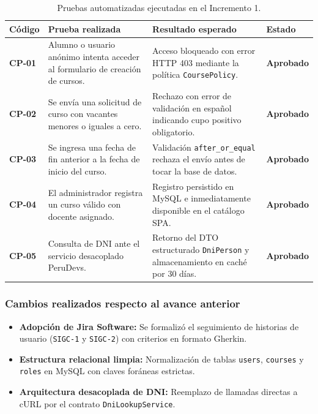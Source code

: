 \begin{table}[H]
\centering
\small
\begin{tabularx}{\textwidth}{P{1.8cm} P{4.8cm} P{4.5cm} Y}
\toprule
\textbf{Código} & \textbf{Prueba realizada} & \textbf{Resultado esperado} & \textbf{Estado} \\
\midrule
\textbf{CP-01} & Alumno o usuario anónimo intenta acceder al formulario de creación de cursos. & Acceso bloqueado con error HTTP 403 mediante la política \texttt{CoursePolicy}. & \textbf{Aprobado} \\
\addlinespace
\textbf{CP-02} & Se envía una solicitud de curso con vacantes menores o iguales a cero. & Rechazo con error de validación en español indicando cupo positivo obligatorio. & \textbf{Aprobado} \\
\addlinespace
\textbf{CP-03} & Se ingresa una fecha de fin anterior a la fecha de inicio del curso. & Validación \texttt{after\_or\_equal} rechaza el envío antes de tocar la base de datos. & \textbf{Aprobado} \\
\addlinespace
\textbf{CP-04} & El administrador registra un curso válido con docente asignado. & Registro persistido en MySQL e inmediatamente disponible en el catálogo SPA. & \textbf{Aprobado} \\
\addlinespace
\textbf{CP-05} & Consulta de DNI ante el servicio desacoplado PeruDevs. & Retorno del DTO estructurado \texttt{DniPerson} y almacenamiento en caché por 30 días. & \textbf{Aprobado} \\
\bottomrule
\end{tabularx}
\caption{Pruebas automatizadas ejecutadas en el Incremento 1.}
\label{tab:pruebas_inc1}
\end{table}

\subsubsection{Cambios realizados respecto al avance anterior}
\begin{itemize}[nosep]
    \item \textbf{Adopción de Jira Software:} Se formalizó el seguimiento de historias de usuario (\texttt{SIGC-1} y \texttt{SIGC-2}) con criterios en formato Gherkin.
    \item \textbf{Estructura relacional limpia:} Normalización de tablas \texttt{users}, \texttt{courses} y \texttt{roles} en MySQL con claves foráneas estrictas.
    \item \textbf{Arquitectura desacoplada de DNI:} Reemplazo de llamadas directas a cURL por el contrato \texttt{DniLookupService}.
\end{itemize}

